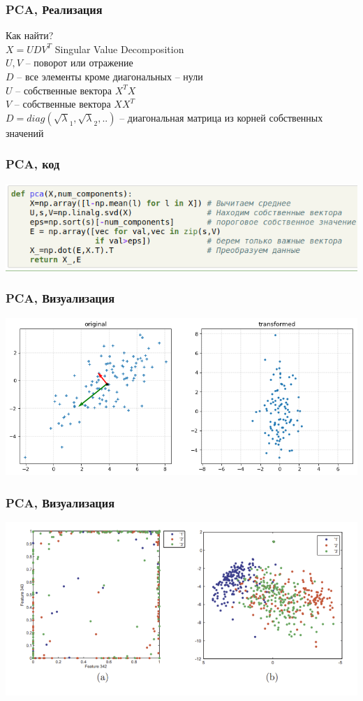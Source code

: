 \documentclass[14pt]{beamer}
\begin{document}
\begin{frame}
\frametitle{PCA, Реализация}
	Как найти?\\
	$X=UDV^T$ Singular Value Decomposition\\
	$U,V$ -- поворот или отражение\\
	$D$ -- все элементы кроме диагональных -- нули\\
	\vspace{1em}
	\pause
	$U$ -- собственные вектора $X^TX$\\
	$V$ -- собственные вектора $XX^T$\\
	$D=diag(\sqrt\lambda_1,\sqrt\lambda_2,..)$ -- диагональная матрица из корней собственных значений\\
\end{frame}

\begin{frame}
\frametitle{PCA, код}
	\includegraphics[width=\linewidth]{pcacode.png}
\end{frame}
\begin{frame}
\frametitle{PCA, Визуализация}
	\includegraphics[width=\linewidth]{pca.png}
\end{frame}
\begin{frame}
\frametitle{PCA, Визуализация}
	\includegraphics[width=\linewidth]{pca2.png}
\end{frame}
\end{document}

